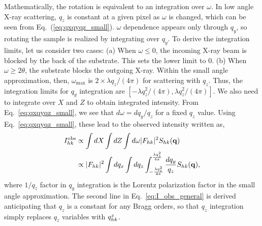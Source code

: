 Mathematically, the rotation is  
equivalent to an integration over $\omega$. In low angle X-ray scattering, 
$q_z$ is constant at a given pixel as $\omega$ is changed, which can be seen from 
Eq.~(\ref{eq:qxqyqz_small}). $\omega$ dependence appears only through $q_y$, 
so rotating the sample is realized by integrating over $q_y$. 
To derive the integration limits, let us consider two cases: (a) When $\omega \leq 0$,
the incoming X-ray beam is blocked by the back of the substrate. This sets 
the lower limit to 0. (b) When $\omega \geq 2\theta$, the substrate blocks 
the outgoing X-ray. Within the small angle approximation, then, $\omega_{\text{max}}$
is $2\times \lambda q_z/(4\pi)$ for scattering with $q_z$. 
Thus, the integration limits 
for $q_y$ integration are $[-\lambda q_z^2/(4\pi), \lambda q_z^2/(4\pi)]$.
We also need to integrate over $X$ and $Z$ to obtain integrated intensity. 
From Eq.~\ref{eq:qxqyqz_small}, we see that $d\omega=dq_y/q_z$ for a fixed 
$q_z$ value.
Using Eq.~\ref{eq:qxqyqz_small}, these lead to the observed intensity
written as,
\begin{align}
  I_{hk}^\mathrm{obs} 
    &\propto \int dX \int dZ \int d\omega |F_{hk}|^2 S_{hk}(\mathbf{q}) \nonumber \\
    &\propto |F_{hk}|^2 \int dq_x \int dq_z 
             \int_{-\frac{\lambda q_z^2}{4\pi}}^{\frac{\lambda q_z^2}{4\pi}} 
             \frac{dq_y}{q_z} 
             S_{hk}(\mathbf{q}),
  \label{eq:I_obs_general}
\end{align}
where $1/q_z$ factor in $q_y$ integration is the Lorentz polarization factor
in the small angle approximation. The second line in Eq.~\ref{eq:I_obs_general}
is derived anticipating that $q_z$ is a constant for any Bragg orders, so that
$q_z$ integration simply replaces $q_z$ variables with $q_{hk}^z$. 

